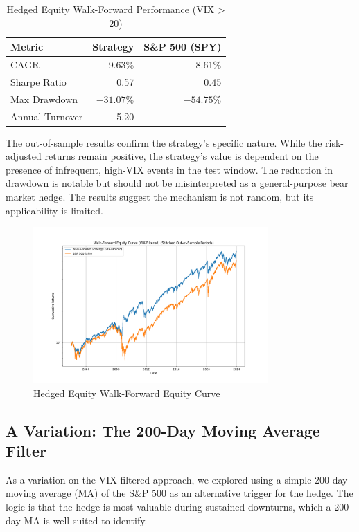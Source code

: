 \documentclass{article}
\begin{document}
\begin{table}[htbp]
\centering
\caption{Hedged Equity Walk-Forward Performance (VIX > 20)}
\begin{tabular}{lrr}
\toprule
\textbf{Metric} & \textbf{Strategy} & \textbf{S\&P 500 (SPY)} \\
\midrule
CAGR           & 9.63\%    & 8.61\%         \\
Sharpe Ratio   & 0.57      & 0.45           \\
Max Drawdown   & $-31.07$\% & $-54.75$\%      \\
Annual Turnover & 5.20      & ---            \\
\bottomrule
\end{tabular}
\end{table}

The out-of-sample results confirm the strategy's specific nature. While the risk-adjusted returns remain positive, the strategy's value is dependent on the presence of infrequent, high-VIX events in the test window. The reduction in drawdown is notable but should not be misinterpreted as a general-purpose bear market hedge. The results suggest the mechanism is not random, but its applicability is limited.

\begin{figure}[htbp]
\centering
\includegraphics[width=0.8\textwidth]{plot_walk_forward_vix_filtered.png}
\caption{Hedged Equity Walk-Forward Equity Curve}
\label{fig:walk_forward_vix}
\end{figure}

\subsection{A Variation: The 200-Day Moving Average Filter}
\label{sec:ma_filter}
As a variation on the VIX-filtered approach, we explored using a simple 200-day moving average (MA) of the S\&P 500 as an alternative trigger for the hedge. The logic is that the hedge is most valuable during sustained downturns, which a 200-day MA is well-suited to identify.
\end{document}
